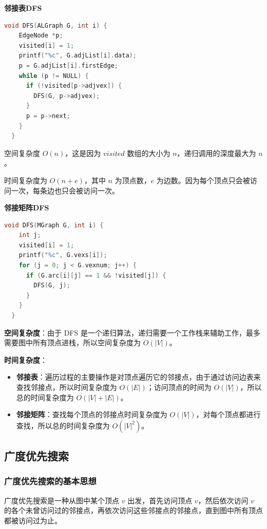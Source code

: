 \documentclass[lang=cn,newtx,10pt,scheme=chinese]{../elegantbook}
\begin{document}
\textbf{邻接表DFS}

\begin{lstlisting}[language=C++, caption={邻接表DFS}]
  void DFS(ALGraph G, int i) {
    EdgeNode *p;
    visited[i] = 1;
    printf("%c", G.adjList[i].data);
    p = G.adjList[i].firstEdge;
    while (p != NULL) {
      if (!visited[p->adjvex]) {
        DFS(G, p->adjvex);
      }
      p = p->next;
    }
  }
\end{lstlisting}

空间复杂度 $O(n)$，这是因为 $visited$ 数组的大小为 $n$，递归调用的深度最大为 $n$。

时间复杂度为 $O(n+e)$，其中 $n$ 为顶点数，$e$ 为边数。因为每个顶点只会被访问一次，每条边也只会被访问一次。

\textbf{邻接矩阵DFS}

\begin{lstlisting}[language=C++, caption={邻接矩阵DFS}]
  void DFS(MGraph G, int i) {
    int j;
    visited[i] = 1;
    printf("%c", G.vexs[i]);
    for (j = 0; j < G.vexnum; j++) {
      if (G.arc[i][j] == 1 && !visited[j]) {
        DFS(G, j);
      }
    }
  }
\end{lstlisting}

\textbf{空间复杂度}：由于 DFS 是一个递归算法，递归需要一个工作栈来辅助工作，最多需要图中所有顶点进栈，所以空间复杂度为 $O(|V|)$。

\textbf{时间复杂度}：
\begin{itemize}
  \item \textbf{邻接表}：遍历过程的主要操作是对顶点遍历它的邻接点，由于通过访问边表来查找邻接点，所以时间复杂度为 $O(|E|)$；访问顶点的时间为 $O(|V|)$，所以总的时间复杂度为 $O(|V| + |E|)$。
  \item \textbf{邻接矩阵}：查找每个顶点的邻接点时间复杂度为 $O(|V|)$，对每个顶点都进行查找，所以总的时间复杂度为 $O(|V|^2)$。
\end{itemize}


\subsection{广度优先搜索}

\subsubsection{广度优先搜索的基本思想}

广度优先搜索是一种从图中某个顶点 $v$ 出发，首先访问顶点 $v$，然后依次访问 $v$ 的各个未曾访问过的邻接点，再依次访问这些邻接点的邻接点，直到图中所有顶点都被访问过为止。
\end{document}
